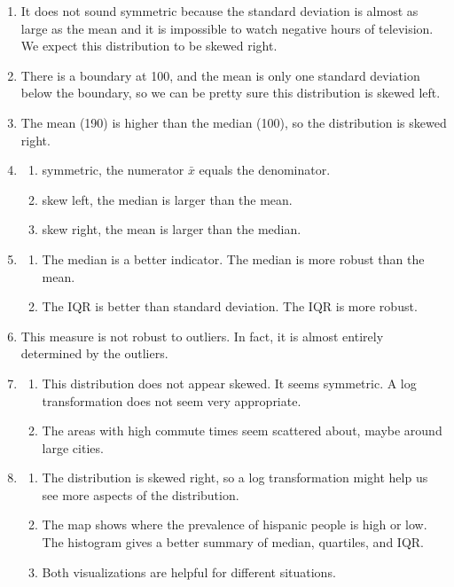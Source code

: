 \documentclass[12pt,letterpaper]{article}
\begin{document}
\begin{enumerate}
\item It does not sound symmetric because the standard deviation is almost as large as the mean and it is impossible to watch negative hours of television. We expect this distribution to be skewed right.

\item There is a boundary at 100, and the mean is only one standard deviation below the boundary, so we can be pretty sure this distribution is skewed left.

\item The mean (190) is higher than the median (100), so the distribution is skewed right.

\item \begin{enumerate}
\item symmetric, the numerator $\bar{x}$ equals the denominator.
\item skew left, the median is larger than the mean.
\item skew right, the mean is larger than the median.
\end{enumerate}

\item \begin{enumerate}
\item The median is a better indicator. The median is more robust than the mean.
\item The IQR is better than standard deviation. The IQR is more robust.
\end{enumerate}

\item This measure is not robust to outliers. In fact, it is almost entirely determined by the outliers.

\item \begin{enumerate}
\item This distribution does not appear skewed. It seems symmetric. A log transformation does not seem very appropriate.
\item The areas with high commute times seem scattered about, maybe around large cities.
\end{enumerate}

\item \begin{enumerate}
\item The distribution is skewed right, so a log transformation might help us see more aspects of the distribution.
\item The map shows where the prevalence of hispanic people is high or low. The histogram gives a better summary of median, quartiles, and IQR.
\item Both visualizations are helpful for different situations.
\end{enumerate}

\end{enumerate}
\end{document}
